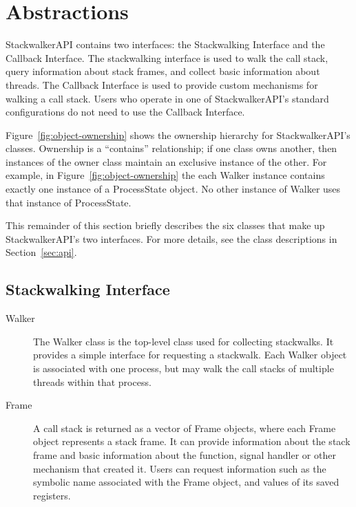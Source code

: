 \section{Abstractions}
\label{sec:abstractions}

StackwalkerAPI contains two interfaces: the Stackwalking Interface and the
Callback Interface. The stackwalking interface is used to walk the call stack,
query information about stack frames, and collect basic information about
threads. The Callback Interface is used to provide custom mechanisms for walking
a call stack. Users who operate in one of StackwalkerAPI's standard
configurations do not need to use the Callback Interface.

Figure~\ref{fig:object-ownership} shows the ownership hierarchy for
StackwalkerAPI's classes. Ownership is a ``contains'' relationship; if one class
owns another, then instances of the owner class maintain an exclusive instance
of the other. For example, in Figure~\ref{fig:object-ownership} the each Walker
instance contains exactly one instance of a ProcessState object.  No other
instance of Walker uses that instance of ProcessState.

This remainder of this
section briefly describes the six classes that make up StackwalkerAPI's two
interfaces. For more details, see the class descriptions in
Section~\ref{sec:api}.



\subsection{Stackwalking Interface}
\begin{description}
    \item [Walker] The Walker class is the top-level class used for collecting
        stackwalks. It provides a simple interface for requesting a stackwalk.
        Each Walker object is associated with one process, but may walk the call
        stacks of multiple threads within that process.
    \item [Frame] A call stack is returned as a vector of Frame objects, where
        each Frame object represents a stack frame. It can provide information
        about the stack frame and basic information about the function, signal
        handler or other mechanism that created it. Users can request
        information such as the symbolic name associated with the Frame object,
        and values of its saved registers.
\end{description}

